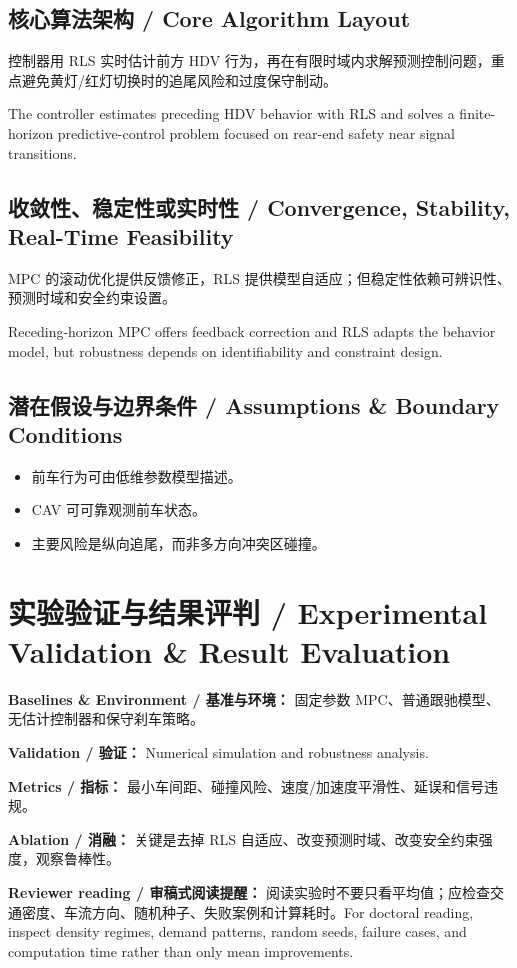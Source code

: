 \documentclass[UTF8,a4paper,11pt,fontset=fandol]{ctexart}
\begin{document}
\subsection{核心算法架构 / Core Algorithm Layout}
控制器用 RLS 实时估计前方 HDV 行为，再在有限时域内求解预测控制问题，重点避免黄灯/红灯切换时的追尾风险和过度保守制动。

The controller estimates preceding HDV behavior with RLS and solves a finite-horizon predictive-control problem focused on rear-end safety near signal transitions.

\subsection{收敛性、稳定性或实时性 / Convergence, Stability, Real-Time Feasibility}
MPC 的滚动优化提供反馈修正，RLS 提供模型自适应；但稳定性依赖可辨识性、预测时域和安全约束设置。

Receding-horizon MPC offers feedback correction and RLS adapts the behavior model, but robustness depends on identifiability and constraint design.

\subsection{潜在假设与边界条件 / Assumptions \& Boundary Conditions}
\begin{itemize}
\item 前车行为可由低维参数模型描述。
\item CAV 可可靠观测前车状态。
\item 主要风险是纵向追尾，而非多方向冲突区碰撞。
\end{itemize}


\section{实验验证与结果评判 / Experimental Validation \& Result Evaluation}
\textbf{Baselines \& Environment / 基准与环境：} 固定参数 MPC、普通跟驰模型、无估计控制器和保守刹车策略。

\textbf{Validation / 验证：} Numerical simulation and robustness analysis.

\textbf{Metrics / 指标：} 最小车间距、碰撞风险、速度/加速度平滑性、延误和信号违规。

\textbf{Ablation / 消融：} 关键是去掉 RLS 自适应、改变预测时域、改变安全约束强度，观察鲁棒性。

\textbf{Reviewer reading / 审稿式阅读提醒：} 阅读实验时不要只看平均值；应检查交通密度、车流方向、随机种子、失败案例和计算耗时。For doctoral reading, inspect density regimes, demand patterns, random seeds, failure cases, and computation time rather than only mean improvements.
\end{document}
